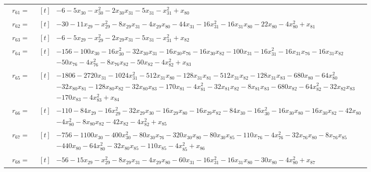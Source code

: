 \begin{longtable}{@{}r p{0.92\linewidth}@{}}
$r_{61}=$ & $\begin{aligned}[t]&-6-5x_{30}-x_{30}^{2}-2x_{30}x_{31}-5x_{31}-x_{31}^{2}+x_{80}\end{aligned}$ \\[2pt]
$r_{62}=$ & $\begin{aligned}[t]&-30-11x_{29}-x_{29}^{2}-8x_{29}x_{31}-4x_{29}x_{80}-44x_{31}-16x_{31}^{2}-16x_{31}x_{80}-22x_{80}-4x_{80}^{2}+x_{81}\end{aligned}$ \\[2pt]
$r_{63}=$ & $\begin{aligned}[t]&-6-5x_{29}-x_{29}^{2}-2x_{29}x_{31}-5x_{31}-x_{31}^{2}+x_{82}\end{aligned}$ \\[2pt]
$r_{64}=$ & $\begin{aligned}[t]&-156-100x_{30}-16x_{30}^{2}-32x_{30}x_{31}-16x_{30}x_{76}-16x_{30}x_{82}-100x_{31}-16x_{31}^{2}-16x_{31}x_{76}-16x_{31}x_{82}\\[-1pt] &-50x_{76}-4x_{76}^{2}-8x_{76}x_{82}-50x_{82}-4x_{82}^{2}+x_{83}\end{aligned}$ \\[2pt]
$r_{65}=$ & $\begin{aligned}[t]&-1806-2720x_{31}-1024x_{31}^{2}-512x_{31}x_{80}-128x_{31}x_{81}-512x_{31}x_{82}-128x_{31}x_{83}-680x_{80}-64x_{80}^{2}\\[-1pt] &-32x_{80}x_{81}-128x_{80}x_{82}-32x_{80}x_{83}-170x_{81}-4x_{81}^{2}-32x_{81}x_{82}-8x_{81}x_{83}-680x_{82}-64x_{82}^{2}-32x_{82}x_{83}\\[-1pt] &-170x_{83}-4x_{83}^{2}+x_{84}\end{aligned}$ \\[2pt]
$r_{66}=$ & $\begin{aligned}[t]&-110-84x_{29}-16x_{29}^{2}-32x_{29}x_{30}-16x_{29}x_{80}-16x_{29}x_{82}-84x_{30}-16x_{30}^{2}-16x_{30}x_{80}-16x_{30}x_{82}-42x_{80}\\[-1pt] &-4x_{80}^{2}-8x_{80}x_{82}-42x_{82}-4x_{82}^{2}+x_{85}\end{aligned}$ \\[2pt]
$r_{67}=$ & $\begin{aligned}[t]&-756-1100x_{30}-400x_{30}^{2}-80x_{30}x_{76}-320x_{30}x_{80}-80x_{30}x_{85}-110x_{76}-4x_{76}^{2}-32x_{76}x_{80}-8x_{76}x_{85}\\[-1pt] &-440x_{80}-64x_{80}^{2}-32x_{80}x_{85}-110x_{85}-4x_{85}^{2}+x_{86}\end{aligned}$ \\[2pt]
$r_{68}=$ & $\begin{aligned}[t]&-56-15x_{29}-x_{29}^{2}-8x_{29}x_{31}-4x_{29}x_{80}-60x_{31}-16x_{31}^{2}-16x_{31}x_{80}-30x_{80}-4x_{80}^{2}+x_{87}\end{aligned}$ \\[2pt]

\end{longtable}
